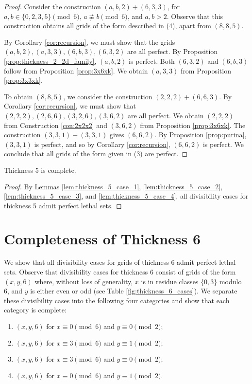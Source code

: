 \begin{proof}
Consider the construction $(a,b,2) + (6,3,3)$, for $a,b \in \{0,2,3,5\} \pmod 6$, $a \not\equiv b \pmod 6$, and $a,b > 2$. Observe that this construction obtains all grids of the form described in (4), apart from $(8,8,5)$.

By Corollary \ref{cor:recursion}, we must show that the grids $(a,b,2), (a,3,3), (6,b,3), (6,3,2)$ are all perfect. By Proposition \ref{prop:thickness_2_2d_family}, $(a,b,2)$ is perfect. Both $(6,3,2)$ and $(6,b,3)$ follow from Proposition \ref{prop:3x6xk}. We obtain $(a,3,3)$ from Proposition \ref{prop:3x3xk}.

To obtain $(8,8,5)$, we consider the construction $(2,2,2) + (6,6,3)$. By Corollary \ref{cor:recursion}, we must show that $(2,2,2), (2,6,6), (3,2,6), (3,6,2)$ are all perfect. We obtain $(2,2,2)$ from Construction \ref{con:2x2x2} and $(3,6,2)$ from Proposition \ref{prop:3x6xk}. The construction $(3,3,1)+(3,3,1)$ gives $(6,6,2)$. By Proposition \ref{prop:purina}, $(3,3,1)$ is perfect, and so by Corollary \ref{cor:recursion}, $(6,6,2)$ is perfect. We conclude that all grids of the form given in (3) are perfect.
\end{proof}

\begin{lem}
\label{lem:thickness_5_complete}
Thickness 5 is complete.
\end{lem}

\begin{proof}
By Lemmas \ref{lem:thickness_5_case_1}, \ref{lem:thickness_5_case_2}, \ref{lem:thickness_5_case_3}, and \ref{lem:thickness_5_case_4}, all divisibility cases for thickness 5 admit perfect lethal sets.
\end{proof}

\section{Completeness of Thickness 6}
We show that all divisibility cases for grids of thickness 6 admit perfect lethal sets. Observe that divisibility cases for thickness 6 consist of grids of the form $(x,y,6)$ where, without loss of generality, $x$ is in residue classes $\{0,3\}$ modulo 6, and $y$ is either even or odd (see Table \ref{fig:thickness_6_cases}). We separate these divisibility cases into the following four categories and show that each category is complete:

\begin{enumerate}
\item $(x,y,6)$ for $x \equiv 0 \pmod 6$ and $y \equiv 0 \pmod 2$;
\item $(x,y,6)$ for $x \equiv 3 \pmod 6$ and $y \equiv 1 \pmod 2$;
\item $(x,y,6)$ for $x \equiv 3 \pmod 6$ and $y \equiv 0 \pmod 2$;
\item $(x,y,6)$ for $x \equiv 0 \pmod 6$ and $y \equiv 1 \pmod 2$.
\end{enumerate}

